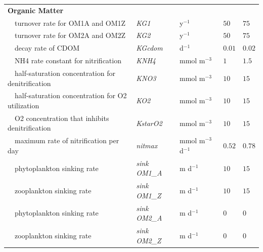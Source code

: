 \documentclass[review]{elsarticle}\usepackage[]{graphicx}\usepackage[]{color}
\begin{document}
\begin{table}[!tbp]
{\begin{center}
\begin{tabular}{lllll}
\hline
{\bfseries Organic Matter}&&&&\tabularnewline
~~turnover rate for OM1A and OM1Z&\textit{KG1}&y$^{-1}$&$50$&$75$\tabularnewline
~~turnover rate for OM2A and OM2Z&\textit{KG2}&y$^{-1}$&$50$&$75$\tabularnewline
~~decay rate of CDOM&\textit{KGcdom}&d$^{-1}$&$0.01$&$0.02$\tabularnewline
~~NH4 rate constant for nitrification&\textit{KNH4}&mmol m$^{-3}$&$1$&$1.5$\tabularnewline
~~half-saturation concentration for denitrification&\textit{KNO3}&mmol m$^{-3}$&$10$&$15$\tabularnewline
~~half-saturation concentration for O2 utilization&\textit{KO2}&mmol m$^{-3}$&$10$&$15$\tabularnewline
~~O2 concentration that inhibits denitrification&\textit{KstarO2}&mmol m$^{-3}$&$10$&$15$\tabularnewline
~~maximum rate of nitrification per day&\textit{nitmax}&mmol m$^{-3}$ d$^{-1}$&$0.52$&$0.78$\tabularnewline
~~phytoplankton sinking rate&\textit{sink OM1\_A}&m d$^{-1}$&$10$&$15$\tabularnewline
~~zooplankton sinking rate&\textit{sink OM1\_Z}&m d$^{-1}$&$10$&$15$\tabularnewline
~~phytoplankton sinking rate&\textit{sink OM2\_A}&m d$^{-1}$&$0$&$0$\tabularnewline
~~zooplankton sinking rate&\textit{sink OM2\_Z}&m d$^{-1}$&$0$&$0$\tabularnewline
\hline
\end{tabular}\end{center}}
\end{table}
\end{document}
